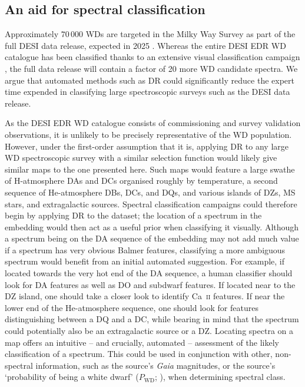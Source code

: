 \documentclass[fleqn,usenatbib]{mnras}
\begin{document}
\subsection{An aid for spectral classification}

Approximately $70\,000$ WDs are targeted in the Milky Way Survey as part of the full DESI data release, expected in 2025 \citep{cooper23}.
Whereas the entire DESI EDR WD catalogue has been classified thanks to an extensive visual classification campaign \citep{manser24}, the full data release will contain a factor of 20 more WD candidate spectra.
We argue that automated methods such as DR could significantly reduce the expert time expended in classifying large spectroscopic surveys such as the DESI data release.

As the DESI EDR WD catalogue consists of commissioning and survey validation observations, it is unlikely to be precisely representative of the WD population.
However, under the first-order assumption that it is, applying DR to any large WD spectroscopic survey with a similar selection function would likely give similar maps to the one presented here.
Such maps would feature a large swathe of H-atmosphere DAs and DCs organised roughly by temperature, a second sequence of He-atmosphere DBs, DCs, and DQs, and various islands of DZs, MS stars, and extragalactic sources.
Spectral classification campaigns could therefore begin by applying DR to the dataset; the location of a spectrum in the embedding would then act as a useful prior when classifying it visually.
Although a spectrum being on the DA sequence of the embedding may not add much value if a spectrum has very obvious Balmer features, classifying a more ambiguous spectrum would benefit from an initial automated suggestion.
For example, if located towards the very hot end of the DA sequence, a human classifier should look for DA features as well as DO and subdwarf features.
If located near to the DZ island, one should take a closer look to identify Ca~\textsc{ii} features.
If near the lower end of the He-atmosphere sequence, one should look for features distinguishing between a DQ and a DC, while bearing in mind that the spectrum could potentially also be an extragalactic source or a DZ.
Locating spectra on a map offers an intuitive -- and crucially, automated -- assessment of the likely classification of a spectrum.
This could be used in conjunction with other, non-spectral information, such as the source's \textit{Gaia} magnitudes, or the source's `probability of being a white dwarf' ($P_\text{WD}$; \citealt{gentilefusillo15}), when determining spectral class.
\end{document}

